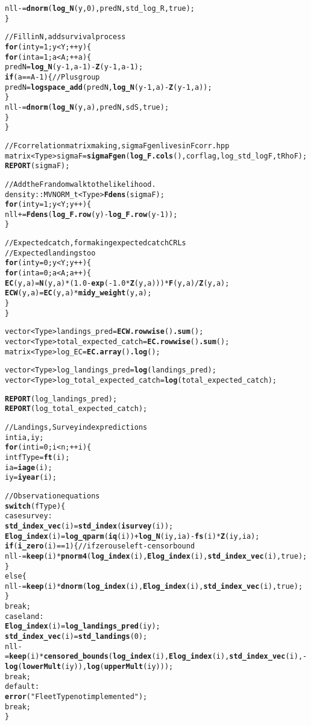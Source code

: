 \documentclass[11pt]{article}\usepackage[]{graphicx}\usepackage[]{color}
\makeatletter
\newcommand{\hlstr}[1]{\textcolor[rgb]{0.192,0.494,0.8}{#1}}%
\newcommand{\hlkwd}[1]{\textcolor[rgb]{0.737,0.353,0.396}{\textbf{#1}}}%
\newenvironment{kframe}{%
 \def\at@end@of@kframe{}%
 \ifinner\ifhmode%
  \def\at@end@of@kframe{\end{minipage}}%
  \begin{minipage}{\columnwidth}%
 \fi\fi%
 \def\FrameCommand##1{\hskip\@totalleftmargin \hskip-\fboxsep
 \colorbox{shadecolor}{##1}\hskip-\fboxsep
     \hskip-\linewidth \hskip-\@totalleftmargin \hskip\columnwidth}%
 \MakeFramed {\advance\hsize-\width
   \@totalleftmargin\z@ \linewidth\hsize
   \@setminipage}}%
 {\par\unskip\endMakeFramed%
 \at@end@of@kframe}
\newenvironment{knitrout}{}{} %
\makeatother
\begin{document}
\begin{appendices}
\begin{knitrout}
\begin{kframe}
\begin{alltt}
  nll -= \hlkwd{dnorm}(\hlkwd{log_N}(y,0),predN,std_log_R,true);
\}


//Fill in N, add survival process
\hlkwd{for}(int y = 1;y < Y;++y)\{
  \hlkwd{for}(int a = 1;a < A;++a)\{
    predN = \hlkwd{log_N}(y-1,a-1)-\hlkwd{Z}(y-1,a-1);
    \hlkwd{if}(a == A-1)\{//Plus group
	predN = \hlkwd{logspace_add}(predN,\hlkwd{log_N}(y-1,a)-\hlkwd{Z}(y-1,a));
    \}
    nll -= \hlkwd{dnorm}(\hlkwd{log_N}(y,a),predN,sdS,true);
  \}
\}

//F correlation matrix making, sigmaFgen lives in Fcorr.hpp
matrix<Type> sigmaF = \hlkwd{sigmaFgen}(\hlkwd{log_F.cols}(),corflag,log_std_logF,tRhoF);
\hlkwd{REPORT}(sigmaF);

//Add the F random walk to the likelihood.
density::MVNORM_t<Type> \hlkwd{Fdens}(sigmaF);
\hlkwd{for}(int y = 1; y < Y;y++)\{
  nll += \hlkwd{Fdens}(\hlkwd{log_F.row}(y)-\hlkwd{log_F.row}(y-1));
\}

//Expected catch, for making expected catch CRLs
//Expected landings too
\hlkwd{for}(int y = 0;y <Y;y++)\{
  \hlkwd{for}(int a = 0;a <A;a++)\{
    \hlkwd{EC}(y,a) = \hlkwd{N}(y,a)*(1.0-\hlkwd{exp}(-1.0*\hlkwd{Z}(y,a)))*\hlkwd{F}(y,a)/\hlkwd{Z}(y,a);
    \hlkwd{ECW}(y,a) = \hlkwd{EC}(y,a)*\hlkwd{midy_weight}(y,a);
  \}
\}

vector<Type> landings_pred = \hlkwd{ECW.rowwise}()\hlkwd{.sum}();
vector<Type> total_expected_catch = \hlkwd{EC.rowwise}()\hlkwd{.sum}();
matrix<Type> log_EC = \hlkwd{EC.array}()\hlkwd{.log}();

vector<Type> log_landings_pred = \hlkwd{log}(landings_pred);
vector<Type> log_total_expected_catch = \hlkwd{log}(total_expected_catch);

\hlkwd{REPORT}(log_landings_pred);
\hlkwd{REPORT}(log_total_expected_catch);

// Landings, Survey index predictions
int ia,iy;
\hlkwd{for}(int i = 0;i < n;++i)\{
  int fType = \hlkwd{ft}(i);
  ia = \hlkwd{iage}(i);
  iy = \hlkwd{iyear}(i);

  //Observation equations
  \hlkwd{switch}(fType)\{
  case survey:
    \hlkwd{std_index_vec}(i) = \hlkwd{std_index}(\hlkwd{isurvey}(i));
    \hlkwd{Elog_index}(i) = \hlkwd{log_qparm}(\hlkwd{iq}(i)) + \hlkwd{log_N}(iy,ia) - \hlkwd{fs}(i)*\hlkwd{Z}(iy,ia);
    \hlkwd{if}(\hlkwd{i_zero}(i) == 1)\{ //if zero use left-censor bound
	nll -= \hlkwd{keep}(i)*\hlkwd{pnorm4}(\hlkwd{log_index}(i),\hlkwd{Elog_index}(i),\hlkwd{std_index_vec}(i),true);
    \}      
    else\{
	nll -= \hlkwd{keep}(i)*\hlkwd{dnorm}(\hlkwd{log_index}(i),\hlkwd{Elog_index}(i),\hlkwd{std_index_vec}(i),true);
    \}
    break;
  case land:
    \hlkwd{Elog_index}(i) = \hlkwd{log_landings_pred}(iy);
    \hlkwd{std_index_vec}(i) = \hlkwd{std_landings}(0);
    nll -= \hlkwd{keep}(i)*\hlkwd{censored_bounds}(\hlkwd{log_index}(i),\hlkwd{Elog_index}(i),\hlkwd{std_index_vec}(i),-\hlkwd{log}(\hlkwd{lowerMult}(iy)),\hlkwd{log}(\hlkwd{upperMult}(iy)));
    break;
  default:
    \hlkwd{error}(\hlstr{"Fleet Type not implemented"});
    break;
  \}
  

\end{alltt}
\end{kframe}
\end{knitrout}
\end{appendices}
\end{document}
